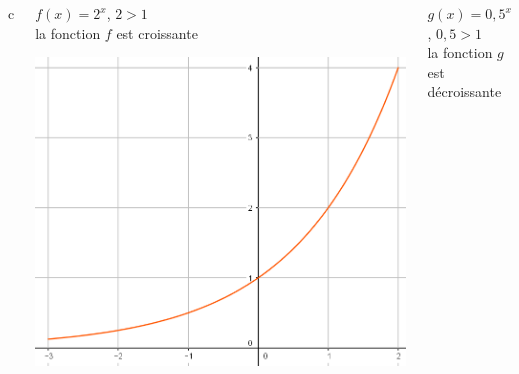 \documentclass[xcolor={dvipsnames}]{beamer}
\begin{document}
\begin{frame}
\begin{myex}
	\begin{columns}{c}
		\begin{column}{6cm}
					
			$f(x)= 2^x$, $2 > 1$\\
			la fonction $f$ est croissante
		
			\begin{center}
				\includegraphics[scale=0.25]{var1}
			\end{center}
		
		\end{column}
		
		\begin{column}{6cm}
			$g(x)= 0,5^x$, $0,5 > 1$\\
			la fonction $g$ est décroissante
			

\end{column}
\end{columns}
\end{myex}
\end{frame}
\end{document}
